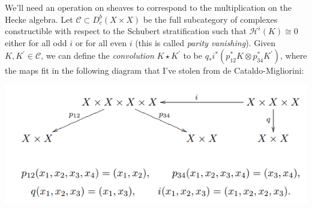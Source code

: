 \documentclass[leqno, openany]{memoir}
\theoremstyle{definition}
\theoremstyle{remark}
\theoremstyle{plain}
\theoremstyle{definition}
\theoremstyle{remark}
\begin{document}
We'll need an operation on sheaves to correspond to the multiplication on the Hecke algebra. Let $\mathcal{C} \subset D_c^b(X \times X)$ be the full subcategory of complexes constructible with respect to the Schubert stratification such that $\mathcal{H}^i(K) \cong 0$ either for all odd $i$ or for all even $i$ (this is called \textit{parity vanishing}). Given $K,K^{\prime} \in \mathcal{C}$, we can define the \textit{convolution} $K \star K^{\prime}$ to be $q_*i^*(p_{12}^*K \otimes p_{34}^*K^{\prime})$, where the maps fit in the following diagram that I've stolen from de Cataldo-Migliorini:

\begin{center}
\includegraphics[scale=0.8]{convolution_maps.PNG}
\end{center}
\end{document}
